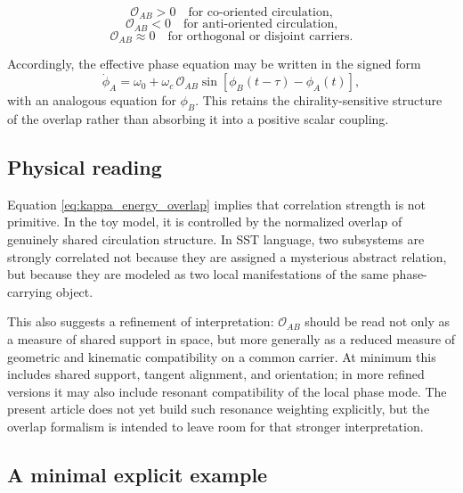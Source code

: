 \documentclass[11pt]{article}
\begin{document}
            \[
                \mathcal{O}_{AB}>0
                \quad\text{for co-oriented circulation,}
            \]
            \[
                \mathcal{O}_{AB}<0
                \quad\text{for anti-oriented circulation,}
            \]
            \[
                \mathcal{O}_{AB}\approx 0
                \quad\text{for orthogonal or disjoint carriers.}
            \]
            
            Accordingly, the effective phase equation may be written in the signed form
            \begin{equation}
                \dot{\phi}_A
                =
                \omega_0
                +
                \omega_c\,\mathcal{O}_{AB}
                \sin[\phi_B(t-\tau)-\phi_A(t)],
            \end{equation}
            with an analogous equation for \(\phi_B\). This retains the chirality-sensitive structure of the overlap rather than absorbing it into a positive scalar coupling.
        
        \subsection{Physical reading}
            Equation \eqref{eq:kappa_energy_overlap} implies that correlation strength is not primitive. In the toy model, it is controlled by the normalized overlap of genuinely shared circulation structure. In SST language, two subsystems are strongly correlated not because they are assigned a mysterious abstract relation, but because they are modeled as two local manifestations of the same phase-carrying object.

            This also suggests a refinement of interpretation: \(\mathcal{O}_{AB}\) should be read not only as a measure of shared support in space, but more generally as a reduced measure of geometric and kinematic compatibility on a common carrier. At minimum this includes shared support, tangent alignment, and orientation; in more refined versions it may also include resonant compatibility of the local phase mode. The present article does not yet build such resonance weighting explicitly, but the overlap formalism is intended to leave room for that stronger interpretation.

        \subsection{A minimal explicit example}
            
\end{document}
